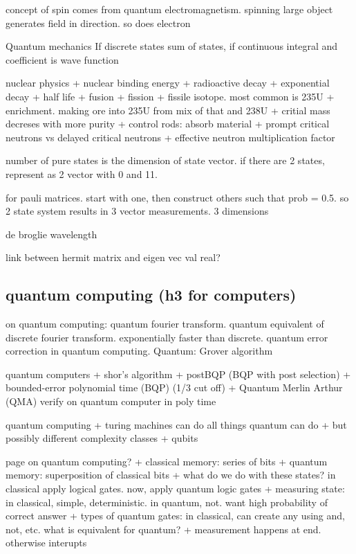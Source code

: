 concept of spin comes from quantum electromagnetism. spinning large object generates field in direction. so does electron

Quantum mechanics
If discrete states sum of states, if continuous integral and coefficient is wave function

nuclear physics
+ nuclear binding energy
+ radioactive decay
+ exponential decay
+ half life
+ fusion
+ fission
+ fissile isotope. most common is 235U
+ enrichment. making ore into 235U from mix of that and 238U
+ critial mass decreses with more purity
+ control rods: absorb material
+ prompt critical neutrons vs delayed critical neutrons
+ effective neutron multiplication factor

number of pure states is the dimension of state vector. if there are 2 states, represent as 2 vector with 0 and 11.

for pauli matrices. start with one, then construct others such that prob = 0.5. so 2 state system results in 3 vector measurements. 3 dimensions

de broglie wavelength

link between hermit matrix and eigen vec val real?

\subsection{quantum computing (h3 for computers)}


on quantum computing: quantum fourier transform. quantum equivalent of discrete fourier transform. exponentially faster than discrete.
quantum error correction in quantum computing.
Quantum: Grover algorithm

quantum computers
+ shor's algorithm
+ postBQP (BQP with post selection)
+ bounded-error polynomial time (BQP) (1/3 cut off)
+ Quantum Merlin Arthur (QMA) verify on quantum computer in poly time



quantum computing
+ turing machines can do all things quantum can do
+ but possibly different complexity classes
+ qubits


page on quantum computing?
+ classical memory: series of bits
+ quantum memory: superposition of classical bits
+ what do we do with these states? in classical apply logical gates. now, apply quantum logic gates
+ measuring state: in classical, simple, deterministic. in quantum, not. want high probability of correct answer
+ types of quantum gates: in classical, can create any using and, not, etc. what is equivalent for quantum?
+ measurement happens at end. otherwise interupts



